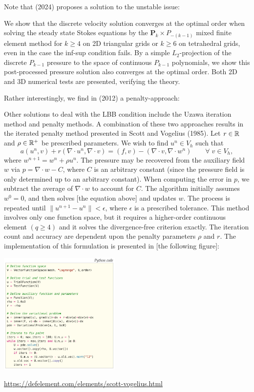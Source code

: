  
Note that \textcite{zhan24} (2024) proposes a solution to the unstable issue: 
\begin{displayquote}
{\color{darkgray}
We show that the discrete velocity solution converges at
the optimal order when solving the steady state Stokes
equations by the ${\bm P}_k\times P_{-(k-1)}$ mixed finite element method for
$k \ge 4$ on 2D triangular grids or $k \ge 6$ on tetrahedral grids,
even in the case the inf-sup condition fails. By a simple
$L_2$-projection of the discrete $P_{k-1}$ pressure to the space of
continuous $P_{k-1}$ polynomials, we show this post-processed
pressure solution also converges at the optimal order. Both
2D and 3D numerical tests are presented, verifying the
theory.
}
\end{displayquote}

Rather interestingly, we find in \textcite{tesk12} (2012) a penalty-approach:
\begin{displayquote}
{\color{darkgray}
Other solutions to deal with the LBB condition include the Uzawa iteration method and penalty
methods. A combination of these two approaches results in the iterated penalty method presented in
Scott and Vogelius (1985). Let $r\in{\mathbb{R}}$ and $\rho\in{\mathbb{R}}^+$ be prescribed parameters. 
We wish to ﬁnd $u^n\in V_h$ such that 
\[
a(u^n,v) + r(\nabla\cdot u^n,\nabla\cdot v) = (f,v) - (\nabla \cdot v, \nabla\cdot w^n)
\qquad \forall \; v\in V_h,
\]
where $w^{n+1}=w^n+\rho u^n$.
The pressure may be recovered from the auxiliary ﬁeld $w$ via $p=\nabla\cdot w -C$, 
where $C$ is an arbitrary constant (since the pressure ﬁeld is only determined up 
to an arbitrary constant). When computing the error in $p$, we subtract the average 
of $\nabla\cdot w$ to account for $C$. The algorithm initially assumes
$w^0=0$, and then solves [the equation above] and updates $w$. 
The process is repeated until $\| u^{n+1}-u^n\|<\epsilon$, 
where $\epsilon$ is a prescribed tolerance. This method involves only one function space, but
it requires a higher-order continuous element $(q\ge 4)$ and it solves the divergence-free criterion
exactly. The iteration count and accuracy are dependent upon the penalty parameters $\rho$ and $r$. 
The implementation of this formulation is presented in [the following figure]:
\begin{center}
\includegraphics[width=6cm]{images/pair_scott_vogelius/tesk12}
\end{center}

}
\end{displayquote}



\begin{center}
\url{https://defelement.com/elements/scott-vogelius.html}
\end{center}



